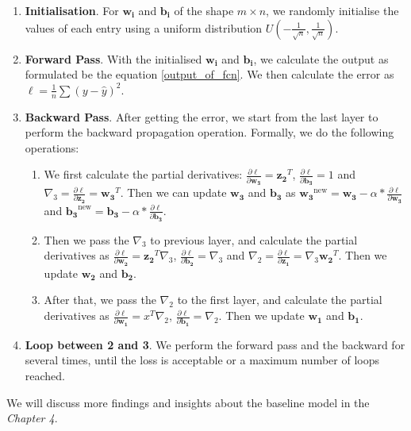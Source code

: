 \begin{enumerate}
	\item \textbf{Initialisation}. For $\boldsymbol{w_i}$ and $\boldsymbol{b_i}$ of the shape $m\times n$, we randomly initialise the values of each entry using a uniform distribution $U(-\frac{1}{\sqrt{n}}, \frac{1}{\sqrt{n}})$.
	\item \textbf{Forward Pass}. With the initialised $\boldsymbol{w_i}$ and $\boldsymbol{b_i}$, we calculate the output as formulated be the equation \ref{output_of_fcn}. We then calculate the error as $\ell=\frac{1}{n}\sum(y-\hat{y})^2$.
	\item \textbf{Backward Pass}. After getting the error, we start from the last layer to perform the backward propagation operation. Formally, we do the following operations:
	\begin{enumerate}
		\item We first calculate the partial derivatives: $\frac{\partial \ell}{\partial\boldsymbol{w_3}}=\boldsymbol{z_2}^T$, $\frac{\partial \ell}{\partial\boldsymbol{b_3}}=1$ and \\ $\nabla_3=\frac{\partial \ell}{\partial\boldsymbol{z_2}}=\boldsymbol{w_3}^T$. Then we can update $\boldsymbol{w_3}$ and $\boldsymbol{b_3}$ as $\boldsymbol{w_3}^{\text{new}}=\boldsymbol{w_3}-\alpha*\frac{\partial \ell}{\partial\boldsymbol{w_3}}$ and $\boldsymbol{b_3}^{\text{new}}=\boldsymbol{b_3}-\alpha*\frac{\partial \ell}{\partial\boldsymbol{b_3}}$.
		\item Then we pass the $\nabla_3$ to previous layer, and calculate the partial derivatives as $\frac{\partial \ell}{\partial\boldsymbol{w_2}}=\boldsymbol{z_2}^T\nabla_3$, $\frac{\partial \ell}{\partial\boldsymbol{b_2}}=\nabla_3$ and $\nabla_2=\frac{\partial \ell}{\partial\boldsymbol{z_1}}=\nabla_3\boldsymbol{w_2}^T$. Then we update $\boldsymbol{w_2}$ and $\boldsymbol{b_2}$.
		\item After that, we pass the $\nabla_2$ to the first layer, and calculate the partial derivatives as $\frac{\partial \ell}{\partial\boldsymbol{w_1}}=x^T\nabla_2$, $\frac{\partial \ell}{\partial\boldsymbol{b_1}}=\nabla_2$. Then we update $\boldsymbol{w_1}$ and $\boldsymbol{b_1}$.
	\end{enumerate}
	\item \textbf{Loop between 2 and 3}. We perform the forward pass and the backward for several times, until the loss is acceptable or a maximum number of loops reached.
\end{enumerate}

We will discuss more findings and insights about the baseline model in the \textit{Chapter 4}.









